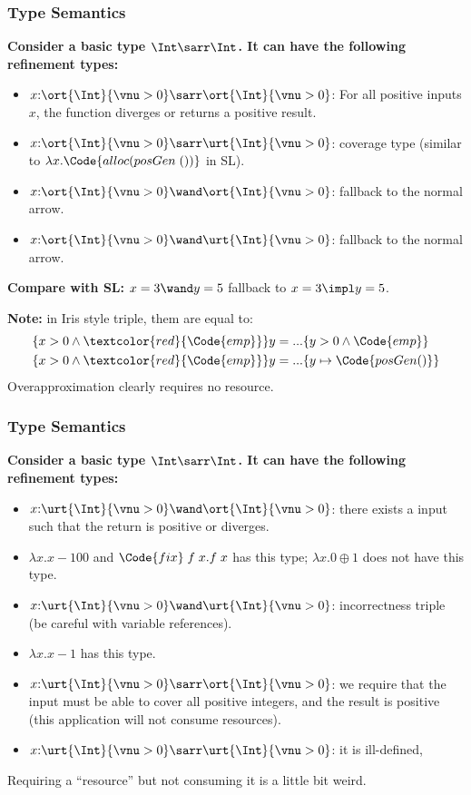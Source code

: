 \begin{frame}
    \frametitle{Type Semantics}

\textbf{Consider a basic type $\Int\sarr\Int$. It can have the following refinement types:}

\begin{itemize}
    \item $x{:}\ort{\Int}{\vnu > 0}\sarr\ort{\Int}{\vnu > 0}$: For all positive inputs $x$, the function diverges or returns a positive result.
    \item $x{:}\ort{\Int}{\vnu > 0}\sarr\urt{\Int}{\vnu > 0}$: coverage type (similar to $\lambda x. \Code{alloc(posGen\;())}$ in SL).
    \item $x{:}\ort{\Int}{\vnu > 0}\wand\ort{\Int}{\vnu > 0}$: fallback to the normal arrow.
    \item $x{:}\ort{\Int}{\vnu > 0}\wand\urt{\Int}{\vnu > 0}$: fallback to the normal arrow.
\end{itemize}

\textbf{Compare with SL:} $x = 3 \wand y =  5$ fallback to $x = 3 \impl y = 5$.

\textbf{Note:} in Iris style triple, them are equal to:
\begin{align*}
    &\{x > 0 \land \textcolor{red}{\Code{emp}}\} y = ... \{ y > 0 \land \Code{emp} \} 
    \\&\{x > 0 \land \textcolor{red}{\Code{emp}}\} y = ... \{ y \mapsto \Code{posGen()} \} 
\end{align*}
Overapproximation clearly requires no resource.
    
\end{frame}

\begin{frame}
    \frametitle{Type Semantics}

\textbf{Consider a basic type $\Int\sarr\Int$. It can have the following refinement types:}

\begin{itemize}
    \item $x{:}\urt{\Int}{\vnu > 0}\wand\ort{\Int}{\vnu > 0}$: there exists a input such that the return is positive or diverges.
    \item $\lambda x. x - 100$ and $\Code{fix}\;f\;x. f\;x$ has this type; $\lambda x. 0 \oplus 1$ does not have this type.
    \item $x{:}\urt{\Int}{\vnu > 0}\wand\urt{\Int}{\vnu > 0}$: incorrectness triple (be careful with variable references).
    \item $\lambda x. x - 1$ has this type.
    \item $x{:}\urt{\Int}{\vnu > 0}\sarr\ort{\Int}{\vnu > 0}$: we require that the input must be able to cover all positive integers, and the result is positive (this application will not consume resources).
    \item $x{:}\urt{\Int}{\vnu > 0}\sarr\urt{\Int}{\vnu > 0}$: it is ill-defined, 
\end{itemize}

Requiring a ``resource'' but not consuming it is a little bit weird.
    
\end{frame}

